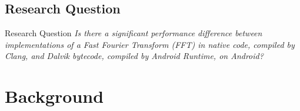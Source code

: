 \documentclass[xcolor={table}]{beamer}
\begin{document}
\subsection{Research Question}
\begin{frame}{Research Question}
\centering
\emph{Is there a significant performance difference between implementations of a Fast Fourier Transform (FFT) in native code, compiled by Clang, and Dalvik bytecode, compiled by Android Runtime, on Android?}
\end{frame}

\section{Background}

\end{document}
